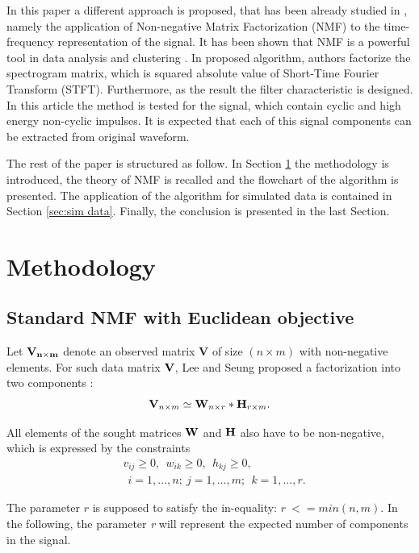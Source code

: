 \documentclass[conference]{IEEEtran}
\newcommand{\beq}{\begin{equation}}
\newcommand{\eeq}{\end{equation}}
\begin{document}
In this paper a different approach is proposed, that has been already studied in \cite{wodecki2017local}, namely the application of Non-negative Matrix Factorization (NMF) to the time-frequency representation of the signal. It has been shown that NMF is a powerful tool in data analysis and clustering \cite{cichocki2009nonnegative, zdunek2008data, wang2013nonnegative,lee1999learning, he2011symmetric}. In proposed algorithm, authors factorize the spectrogram matrix, which is squared absolute value of Short-Time Fourier Transform (STFT). Furthermore, as the result the filter characteristic is designed. In this article the method is tested for the signal, which contain cyclic and high energy non-cyclic impulses. It is expected that each of this signal components can be extracted from original waveform.

The rest of the paper is structured as follow. In Section \ref{sec:methodology} the methodology is introduced, the theory of NMF is recalled and the flowchart of the algorithm is presented. The application of the algorithm for simulated data is contained in Section \ref{sec:sim data}. Finally, the conclusion is presented in the last Section.
\section{Methodology}
\label{sec:methodology}
\subsection{Standard NMF with Euclidean objective}

Let $\bf{V}_{n\times m} $ denote an observed matrix {\bf  V} of
size $(n\times m)$ with non-negative elements. For such data matrix
${\bf V}$, Lee and Seung  proposed a factorization into two components \cite{lee2001algorithms}:
\beq\label{V1} {\bf V}_{n\times m}\simeq
      {\bf W}_{n\times r}*{\bf H}_{r\times m}. \eeq
      
     
All elements of the sought matrices ${\bf W}$ and ${\bf H}$ also have to be
non-negative, which is expressed by the constraints
\begin{align*}
    &v_{ij}\ge0,~~w_{ik}\ge 0,~~ h_{kj}\ge 0,\\
    &~~i=1, \dots, n; ~j=1,\dots, m;
                ~~k=1,\dots,r.
\end{align*}

The parameter $r$ is supposed to satisfy the in-equality: $r~<= min(n,m)$.
In the following, the parameter \emph{r} will represent the expected number of components in the signal.
\end{document}
